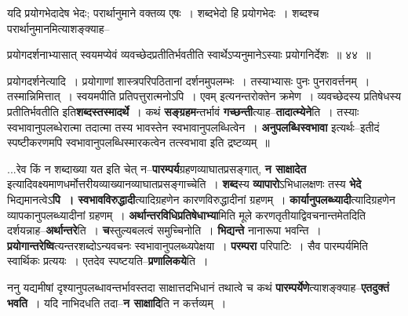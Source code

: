 \documentclass[article,12pt,a4paper]{memoir}
\begin{document}
	यदि प्रयोगभेदादेष भेदः; परार्थानुमाने वक्तव्य एषः । शब्दभेदो हि प्रयोगभेदः । शब्दश्च परार्थानुमानमित्याशङ्क्याह--  
	  
	प्रयोगदर्शनाभ्यासात् स्वयमप्येवं व्यवच्छेदप्रतीतिर्भवतीति स्वार्थेऽप्यनुमानेऽस्याः प्रयोगनिर्देशः ॥ ४४ ॥ 
	  
	प्रयोगदर्शनेत्यादि । प्रयोगाणां शास्त्रपरिपठितानां दर्शनमुपलम्भः । तस्याभ्यासः पुनः पुनरावर्त्तनम् । तस्मान्निमित्तात् । स्वयमपीति प्रतिपत्तुरात्मनोऽपि । एवम् इत्यनन्तरोक्तेन क्रमेण । व्यवच्छेदस्य प्रतिषेधस्य प्रतीतिर्भवतीति इति\textbf{शब्दस्तस्मादर्थे} । कथं \textbf{सङ्ग्रहम}न्तर्भावं \textbf{गच्छन्ती}त्याह--\textbf{तादात्म्येने}ति । तस्याः स्वभावानुपलब्धेरात्मा तदात्मा तस्य भावस्तेन स्वभावानुपलब्धित्वेन । \textbf{अनुपलब्धिस्वभावा} इत्यर्थः--इतीदं स्पष्टीकरणमपि स्वभावानुपलब्धिस्मारकत्वेन तत्स्वभावा इति द्रष्टव्यम् ॥
	\pend
      

	  \pstart {}...रेव किं न शब्दाख्या यत इति चेत् न--\textbf{पारम्पर्य}ग्रहणव्याघातप्रसङ्गात्, \textbf{न साक्षादेत} इत्यादिवक्ष्यमाणधर्मोत्तरीयव्याख्यानव्याघातप्रसङ्गाच्चेति । \textbf{शब्द}स्य \textbf{व्यापारो}ऽभिधालक्षणः तस्य \textbf{भेदे} भिद्यमानत्वेऽ\textbf{पि । स्वभावविरुद्धादी}त्यादिग्रहणेन कारणविरुद्धादीनां ग्रहणम् । \textbf{कार्यानुपलब्ध्यादी}त्यादिग्रहणेन व्यापकानुपलब्ध्यादीनां ग्रहणम् । \textbf{अर्थान्तरविधिप्रतिषेधाभ्या}मिति मूले करणतृतीयाद्विवचनान्तमेतदिति दर्शयन्नाह--\textbf{अर्थान्तरे}ति । \textbf{च}स्तुल्यबलत्वं समुच्चिनोति । \textbf{भिद्यन्ते} नानारूपा भवन्ति । \textbf{प्रयोगान्तरेष्वि}त्यन्तरशब्दोऽन्यवचनः स्वभावानुपलब्ध्यपेक्षया । \textbf{परम्परा} परिपाटिः । सैव पारम्पर्यमिति स्वार्थिकः प्रत्ययः । एतदेव स्पष्टयति--\textbf{प्रणालिकये}ति ।
	\pend
      

	  \pstart ननु यद्यमीषां दृश्यानुपलब्धावन्तर्भावस्तदा साक्षात्तदभिधानं तथात्वे च कथं \textbf{पारम्पर्येणे}त्याशङ्क्याह--\textbf{एतदुक्तं भवति} । यदि नाभिदधति तदा--\textbf{न साक्षादि}ति न कर्त्तव्यम् ।  \leavevmode{} 
	  
\end{document}
